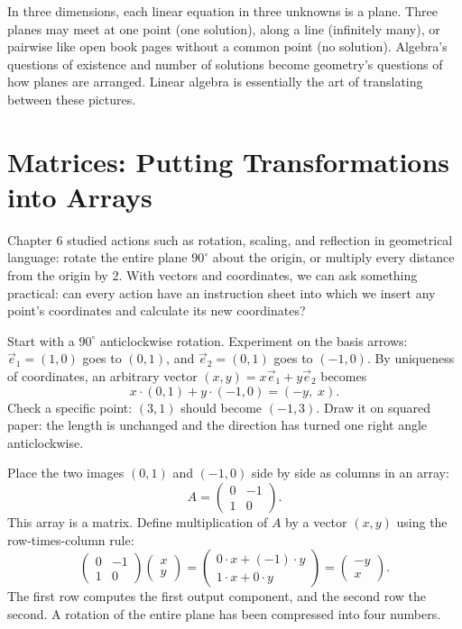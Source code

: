 In three dimensions, each linear equation in three unknowns is a plane. Three planes may meet at one point (one solution), along a line (infinitely many), or pairwise like open book pages without a common point (no solution). Algebra's questions of existence and number of solutions become geometry's questions of how planes are arranged. Linear algebra is essentially the art of translating between these pictures.

\section{Matrices: Putting Transformations into Arrays}

Chapter 6 studied actions such as rotation, scaling, and reflection in geometrical language: rotate the entire plane $90^\circ$ about the origin, or multiply every distance from the origin by $2$. With vectors and coordinates, we can ask something practical: can every action have an instruction sheet into which we insert any point's coordinates and calculate its new coordinates?

Start with a $90^\circ$ anticlockwise rotation. Experiment on the basis arrows: $\vec{e}_1=(1,0)$ goes to $(0,1)$, and $\vec{e}_2=(0,1)$ goes to $(-1,0)$. By uniqueness of coordinates, an arbitrary vector $(x,y)=x\vec{e}_1+y\vec{e}_2$ becomes
\[
x\cdot(0,1)+y\cdot(-1,0)=(-y,\;x).
\]
Check a specific point: $(3,1)$ should become $(-1,3)$. Draw it on squared paper: the length is unchanged and the direction has turned one right angle anticlockwise.

Place the two images $(0,1)$ and $(-1,0)$ side by side as columns in an array:
\[
A=\begin{pmatrix}0&-1\\1&0\end{pmatrix}.
\]
This array is a matrix. Define multiplication of $A$ by a vector $(x,y)$ using the row-times-column rule:
\[
\begin{pmatrix}0&-1\\1&0\end{pmatrix}\begin{pmatrix}x\\y\end{pmatrix}
=\begin{pmatrix}0\cdot x+(-1)\cdot y\\1\cdot x+0\cdot y\end{pmatrix}
=\begin{pmatrix}-y\\x\end{pmatrix}.
\]
The first row computes the first output component, and the second row the second. A rotation of the entire plane has been compressed into four numbers.


